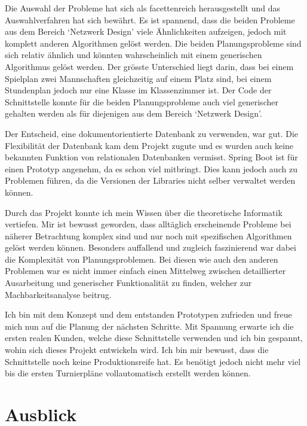 Die Auswahl der Probleme hat sich als facettenreich herausgestellt und das Auswahlverfahren hat sich bewährt. Es ist spannend, dass die beiden Probleme aus dem Bereich `Netzwerk Design' 
viele Ähnlichkeiten aufzeigen, jedoch mit komplett anderen Algorithmen gelöst werden. Die beiden Planungsprobleme sind sich relativ ähnlich und könnten wahrscheinlich mit einem generischen 
Algorithmus gelöst werden. Der grösste Unterschied liegt darin, dass bei einem Spielplan zwei Mannschaften gleichzeitig auf einem Platz sind, bei einem 
Stundenplan jedoch nur eine Klasse im Klassenzimmer ist. Der Code der Schnittstelle konnte für die beiden Planungsprobleme auch viel generischer gehalten werden als für diejenigen aus dem Bereich 
`Netzwerk Design'.

Der Entscheid, eine dokumentorientierte Datenbank zu verwenden, war gut. Die Flexibilität der Datenbank kam dem Projekt zugute und es wurden auch keine bekannten Funktion von relationalen 
Datenbanken vermisst. Spring Boot ist für einen Prototyp angenehm, da es schon viel mitbringt. Dies kann jedoch auch zu Problemen führen, da die Versionen der Libraries nicht selber verwaltet 
werden können. 

Durch das Projekt konnte ich mein Wissen über die theoretische Informatik vertiefen. Mir ist bewusst geworden, dass alltäglich erscheinende Probleme bei näherer Betrachtung komplex sind 
und nur noch mit spezifischen Algorithmen gelöst werden können. Besonders auffallend und zugleich faszinierend war dabei die Komplexität von Planungsproblemen. Bei diesen 
wie auch den anderen Problemen war es nicht immer einfach einen Mittelweg zwischen detaillierter Ausarbeitung und generischer Funktionalität zu finden, welcher zur Machbarkeitsanalyse 
beitrug.

Ich bin mit dem Konzept und dem entstanden Prototypen zufrieden und freue mich nun auf die Planung der nächsten Schritte. Mit Spannung erwarte ich die ersten realen Kunden, welche diese 
Schnittstelle verwenden und ich bin gespannt, wohin sich dieses Projekt entwickeln wird. Ich bin mir bewusst, dass die Schnittstelle noch keine Produktionsreife hat. Es benötigt jedoch nicht mehr 
viel bis die ersten Turnierpläne vollautomatisch erstellt werden können.

\section{Ausblick}\label{fazit_ausblick}

